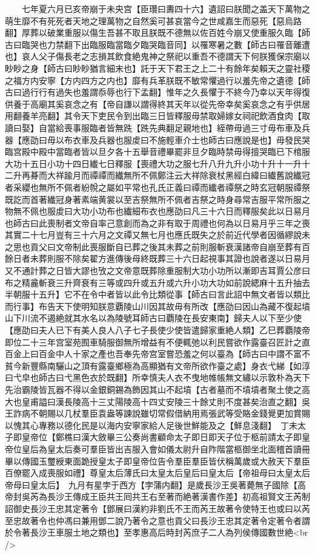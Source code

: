 　　七年夏六月已亥帝崩于未央宫【臣瓚曰夀四十六】遺詔曰朕聞之盖天下萬物之萌生靡不有死死者天地之理萬物之自然奚可甚哀當今之世咸嘉生而惡死【惡烏路翻】厚葬以破業重服以傷生吾甚不取且朕既不德無以佐百姓今崩又使重服久臨【師古曰臨哭也力禁翻下出臨服臨當臨夕臨哭臨音同】以罹寒暑之數【師古曰罹音離遭也】哀人父子傷長老之志損其飲食絶鬼神之祭祀以重吾不德謂天下何朕獲保宗廟以眇眇之身【師古曰眇眇猶言細末也】託于天下君王之上二十有餘年矣賴天之靈社稷之福方内安寧【方内四方之内也】靡有兵革朕既不敏常懼過行以羞先帝之遺德【師古曰過行行有過失也羞謂忝辱也行下孟翻】惟年之久長懼于不終今乃幸以天年得復供養于高廟其奚哀念之有【帝自謙以謂得終其天年以從先帝幸矣奚哀念之有乎供居用翻養羊亮翻】其令天下吏民令到出臨三日皆釋服毋禁取婦嫁女祠祀飲酒食肉【取讀曰娶】自當給喪事服臨者皆無跣【跣先典翻足親地也】絰帶毋過三寸毋布車及兵器【應劭曰毋以布衣車及兵器也服䖍曰不施輕車介士也師古曰應說是也】毋發民哭臨宫殿中殿中當臨者皆以旦夕各十五舉音禮畢罷非旦夕臨時禁毋得擅哭臨已下棺服大功十五日小功十四日纎七日釋服【喪禮大功之服七升八升九升小功十升十一升十二升再朞而大祥踰月而禫禫而纎無所不佩鄭注云大祥除衰杖黑經白緯曰纎舊說纎冠者采纓也無所不佩者紛帨之屬如平常也孔氏正義曰禫而纎者禫祭之時玄冠朝服禫祭既訖而首著纎冠身著素端黄裳以至吉祭無所不佩者吉祭之時身尋常吉服平常所服之物無不佩也服䖍曰大功小功布也纎細布衣也應劭曰凡三十六日而釋服矣此以日易月也師古曰此喪制者文帝自率己意創而為之非有取于周禮也何為以日易月乎三年之喪其實二十七月豈有三十六月之文禫又無七月也應氏既失之於前近代學者因循繆說未之思也貢父曰文帝制此喪服斷自已葬之後其未葬之前則服斬衰漢諸帝自崩至葬有百餘日者未葬則服不除矣翟方進傳後母終既葬三十六日起視事其證也說者遂以日易月又不通計葬之日皆大謬也攷之文帝意既葬除重服制大功小功所以漸即吉耳賈公彦曰布之精麄斬衰三升齊衰有三等或四升或五升或六升小功大功如前說緦麻十五升抽去半朝服十五升】它不在令中者皆以此令比類從事【師古曰言此詔中無文者皆以類比而行事】布告天下使明知朕意覇陵山川因其故毋有所改【應劭曰因山為藏不復起墳山下川流不遏絶就其水名以為陵號耳師古曰覇陵在長安東南】歸夫人以下至少使【應劭曰夫人已下有美人良人八子七子長使少使皆遣歸家重絶人類】乙巳葬覇陵帝即位二十三年宫室苑囿車騎服御無所增益有不便輒弛以利民嘗欲作露臺召匠計之直百金上曰百金中人十家之產也吾奉先帝宫室嘗恐羞之何以臺為【師古曰中謂不富不貧今新豐縣南驪山之頂有露臺鄉極為高顯猶有文帝所欲作臺之處】身衣弋綈【如淳曰弋皁也師古曰弋黑色衣於既翻】所幸慎夫人衣不曳地帷帳無文繡以示敦朴為天下先治霸陵皆瓦器不得以金銀銅錫為飾因其山不起墳【古者墓而不墳墳者聚土使之高大也皇甫謚曰漢長陵高十三丈陽陵高十四丈安陵三十餘丈則不度甚矣治直之翻】吳王詐病不朝賜以几杖羣臣袁盎等諫說雖切常假借納用焉張武等受賂金錢覺更加賞賜以愧其心專務以德化民是以海内安寧家給人足後世鮮能及之【鮮息淺翻】　丁未太子即皇帝位【鄭樵曰漢大斂畢三公奏尚書顧命太子即日即天子位于柩前請太子即皇帝位皇后為皇太后奏可羣臣皆出吉服入會如儀太尉升自阼階當柩御坐北面稽首讀冊畢以傳國玉璽綬東面跪授皇太子即皇帝位告令羣臣羣臣皆伏稱萬歲或大赦天下羣臣百僚罷入成喪服如禮】尊皇太后薄氏曰太皇太后皇后曰皇太后【帝祖母曰太皇太后帝母曰皇太后】　九月有星孛于西方【孛蒲内翻】是歲長沙王吳著薨無子國除【高帝封吳芮為長沙王傳成王臣共王囘共王右至著而絶著漢書作差】初高祖賢文王芮制詔御史長沙王忠其定著令【鄧展曰漢約非劉氏不王而芮王故著令使特王也或曰以芮至忠故著令也仲馮曰兼用鄧二說乃著令之意也貢父曰長沙王忠其定著令定著令者謂於令著長沙王車服土地之類也】至孝惠高后時封芮庶子二人為列侯傳國數世絶<br />
